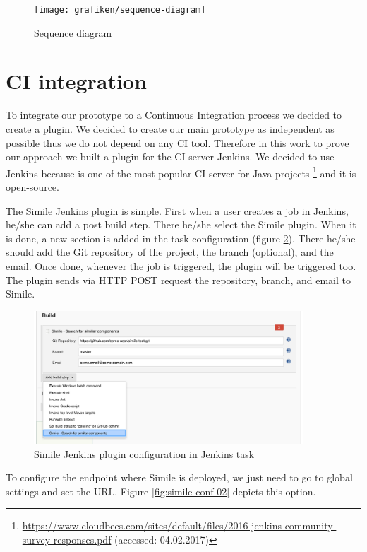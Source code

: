 \begin{figure}[H]
	\centering
    \texttt{[image: grafiken/sequence-diagram]}
    \caption{Sequence diagram}
    \label{fig:sequence-diagram}
\end{figure}

\section{CI integration}
\label{ci-integration}
To integrate our prototype to a Continuous Integration process we decided to create a plugin. We decided to create our main prototype as independent as possible thus we do not depend on any CI tool. Therefore in this work to prove our approach we built a plugin for the CI server Jenkins. We decided to use Jenkins because is one of the most popular CI server for Java projects \footnote{\url{https://www.cloudbees.com/sites/default/files/2016-jenkins-community-survey-responses.pdf} (accessed: 04.02.2017)} and it is open-source.

The Simile Jenkins plugin is simple. First when a user creates a job in Jenkins, he/she can add a post build step. There he/she select the Simile plugin. When it is done, a new section is added in the task configuration (figure \ref{fig:simile-conf-01}). There he/she should add the Git repository of the project, the branch (optional), and the email. Once done, whenever the job is triggered, the plugin will be triggered too. The plugin sends via HTTP POST request the repository, branch, and email to Simile.

\begin{figure}[H]
	\centering
    \includegraphics[width=0.9\textwidth]{grafiken/simile-conf-01}
    \caption{Simile Jenkins plugin configuration in Jenkins task}
    \label{fig:simile-conf-01}
\end{figure}

To configure the endpoint where Simile is deployed, we just need to go to global settings and set the URL. Figure \ref{fig:simile-conf-02} depicts this option.

